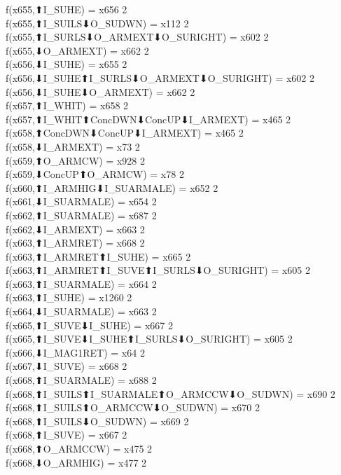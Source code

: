 f(x655,⬆I_SUHE) = x656 {2} \\
f(x655,⬆I_SUILS⬇O_SUDWN) = x112 {2} \\
f(x655,⬆I_SURLS⬇O_ARMEXT⬇O_SURIGHT) = x602 {2} \\
f(x655,⬇O_ARMEXT) = x662 {2} \\
f(x656,⬇I_SUHE) = x655 {2} \\
f(x656,⬇I_SUHE⬆I_SURLS⬇O_ARMEXT⬇O_SURIGHT) = x602 {2} \\
f(x656,⬇I_SUHE⬇O_ARMEXT) = x662 {2} \\
f(x657,⬆I_WHIT) = x658 {2} \\
f(x657,⬆I_WHIT⬆ConcDWN⬇ConcUP⬇I_ARMEXT) = x465 {2} \\
f(x658,⬆ConcDWN⬇ConcUP⬇I_ARMEXT) = x465 {2} \\
f(x658,⬇I_ARMEXT) = x73 {2} \\
f(x659,⬆O_ARMCW) = x928 {2} \\
f(x659,⬇ConcUP⬆O_ARMCW) = x78 {2} \\
f(x660,⬆I_ARMHIG⬇I_SUARMALE) = x652 {2} \\
f(x661,⬇I_SUARMALE) = x654 {2} \\
f(x662,⬆I_SUARMALE) = x687 {2} \\
f(x662,⬇I_ARMEXT) = x663 {2} \\
f(x663,⬆I_ARMRET) = x668 {2} \\
f(x663,⬆I_ARMRET⬆I_SUHE) = x665 {2} \\
f(x663,⬆I_ARMRET⬆I_SUVE⬆I_SURLS⬇O_SURIGHT) = x605 {2} \\
f(x663,⬆I_SUARMALE) = x664 {2} \\
f(x663,⬆I_SUHE) = x1260 {2} \\
f(x664,⬇I_SUARMALE) = x663 {2} \\
f(x665,⬆I_SUVE⬇I_SUHE) = x667 {2} \\
f(x665,⬆I_SUVE⬇I_SUHE⬆I_SURLS⬇O_SURIGHT) = x605 {2} \\
f(x666,⬇I_MAG1RET) = x64 {2} \\
f(x667,⬇I_SUVE) = x668 {2} \\
f(x668,⬆I_SUARMALE) = x688 {2} \\
f(x668,⬆I_SUILS⬆I_SUARMALE⬆O_ARMCCW⬇O_SUDWN) = x690 {2} \\
f(x668,⬆I_SUILS⬆O_ARMCCW⬇O_SUDWN) = x670 {2} \\
f(x668,⬆I_SUILS⬇O_SUDWN) = x669 {2} \\
f(x668,⬆I_SUVE) = x667 {2} \\
f(x668,⬆O_ARMCCW) = x475 {2} \\
f(x668,⬇O_ARMHIG) = x477 {2} \\
